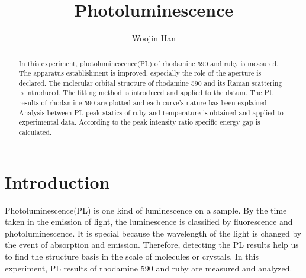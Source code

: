 \documentclass{article}
\begin{document}
\title{Photoluminescence}
\author[1]{Woojin Han}
\maketitle
\begin{abstract}
  In this experiment, photoluminescence(PL) of rhodamine 590 and ruby is measured.
  The apparatus establishment is improved, especially the role of the aperture is declared.
  The molecular orbital structure of rhodamine 590 and its Raman scattering is introduced.
  The fitting method is introduced and applied to the datum.
  The PL results of rhodamine 590 are plotted and each curve's nature has been explained.
  Analysis between PL peak statics of ruby and temperature is obtained and applied to experimental data.
  According to the peak intensity ratio specific energy gap is calculated.
\end{abstract}

\section{Introduction}
 Photoluminescence(PL) is one kind of luminescence on a sample.
 By the time taken in the emission of light, the luminescence is classified by fluorescence and photoluminescence.
 It is special because the wavelength of the light is changed by the event of absorption and emission.
 Therefore, detecting the PL results help us to find the structure basis in the scale of molecules or crystals.
 In this experiment, PL results of rhodamine 590 and ruby are measured and analyzed.
\end{document}
